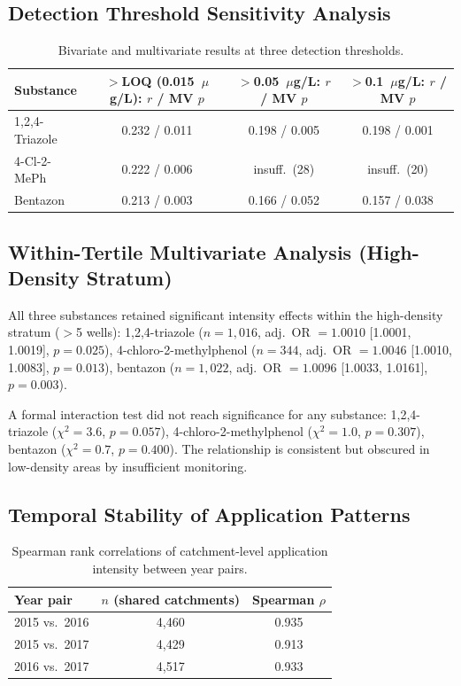 \documentclass[12pt,a4paper]{article}
\begin{document}
\subsection{Detection Threshold Sensitivity Analysis}

\begin{table}[H]
\centering
\caption{Bivariate and multivariate results at three detection thresholds.}
\scriptsize
\begin{tabular}{@{}lccc@{}}
\toprule
Substance & $>$LOQ (0.015~$\mu$g/L): $r$ / MV $p$ & $>$0.05~$\mu$g/L: $r$ / MV $p$ & $>$0.1~$\mu$g/L: $r$ / MV $p$ \\
\midrule
1,2,4-Triazole & 0.232 / 0.011 & 0.198 / 0.005 & 0.198 / 0.001 \\
4-Cl-2-MePh & 0.222 / 0.006 & insuff.\ (28) & insuff.\ (20) \\
Bentazon & 0.213 / 0.003 & 0.166 / 0.052 & 0.157 / 0.038 \\
\bottomrule
\end{tabular}
\end{table}

\subsection{Within-Tertile Multivariate Analysis (High-Density Stratum)}

All three substances retained significant intensity effects within the high-density stratum ($>$5 wells): 1,2,4-triazole ($n = 1{,}016$, adj.\ OR $= 1.0010$ [1.0001, 1.0019], $p = 0.025$), 4-chloro-2-methylphenol ($n = 344$, adj.\ OR $= 1.0046$ [1.0010, 1.0083], $p = 0.013$), bentazon ($n = 1{,}022$, adj.\ OR $= 1.0096$ [1.0033, 1.0161], $p = 0.003$).

A formal interaction test did not reach significance for any substance: 1,2,4-triazole ($\chi^2 = 3.6$, $p = 0.057$), 4-chloro-2-methylphenol ($\chi^2 = 1.0$, $p = 0.307$), bentazon ($\chi^2 = 0.7$, $p = 0.400$). The relationship is consistent but obscured in low-density areas by insufficient monitoring.

\subsection{Temporal Stability of Application Patterns}

\begin{table}[H]
\centering
\caption{Spearman rank correlations of catchment-level application intensity between year pairs.}
\begin{tabular}{@{}lcc@{}}
\toprule
Year pair & $n$ (shared catchments) & Spearman $\rho$ \\
\midrule
2015 vs.\ 2016 & 4,460 & 0.935 \\
2015 vs.\ 2017 & 4,429 & 0.913 \\
2016 vs.\ 2017 & 4,517 & 0.933 \\
\bottomrule
\end{tabular}
\end{table}
\end{document}

